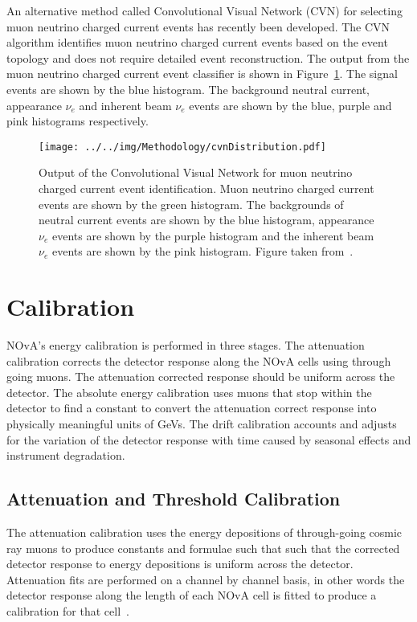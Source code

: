 An alternative method called Convolutional Visual Network (CVN) for
selecting muon neutrino charged current events has recently been
developed. 
The CVN algorithm identifies muon neutrino charged current
events based on the event topology and does not require detailed event
reconstruction. 
The output from the muon neutrino charged current event classifier is
shown in Figure~\ref{fig:cvnDist}. The signal events are shown by the
blue histogram. The background neutral current, appearance $\nu_e$ and
inherent beam $\nu_e$ events are shown by the blue, purple and pink
histograms respectively.
~\cite{aurisano2016convolutional}

\begin{figure}[h]
  \centering
  \texttt{[image: ../../img/Methodology/cvnDistribution.pdf]}
  \caption{
    Output of the Convolutional Visual Network  for muon neutrino
    charged current event identification. Muon neutrino
    charged current events are shown by the green histogram. The
    backgrounds of neutral current
    events are shown by the blue histogram, appearance $\nu_e$ events
    are shown by the purple histogram and the inherent beam $\nu_e$
    events are shown by the pink histogram. Figure taken
    from~\cite{aurisano2016convolutional}.   
  } 
  \label{fig:cvnDist}
\end{figure}



\section{Calibration}\label{sec:calibration}

NOvA's energy calibration is performed in three stages.
The attenuation calibration corrects the detector response along the
NOvA cells using through going muons. The attenuation corrected
response should be uniform across the detector. 
The absolute energy calibration uses muons that stop within the
detector to find a constant to convert the attenuation correct
response into physically meaningful units of GeVs.
The drift calibration accounts and adjusts for the variation of the
detector response with time caused by seasonal effects and instrument
degradation. 


\subsection{Attenuation and Threshold Calibration}

The attenuation calibration uses the energy depositions of
through-going cosmic ray muons to produce constants and formulae such
that such that the corrected detector response to energy depositions
is uniform across the detector. 
Attenuation fits are performed on a channel by channel basis, in other
words the detector response along the length of each NOvA cell is
fitted to produce a calibration for that cell~\cite{alexAtten}. 


